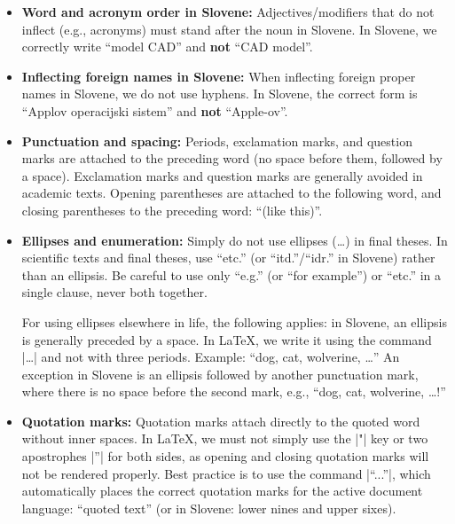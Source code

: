 \documentclass[9pt]{style/friteza}
\begin{document}
\begin{itemize}
    \item \textbf{Word and acronym order in Slovene:} Adjectives/modifiers that do not inflect (e.g., acronyms) must stand after the noun in Slovene. In Slovene, we correctly write \enquote{model CAD} and \textbf{not} \enquote{CAD model}.
    
    \item \textbf{Inflecting foreign names in Slovene:} When inflecting foreign proper names in Slovene, we do not use hyphens. In Slovene, the correct form is \enquote{Applov operacijski sistem} and \textbf{not} \enquote{Apple-ov}.
    
    \item \textbf{Punctuation and spacing:} Periods, exclamation marks, and question marks are attached to the preceding word (no space before them, followed by a space). Exclamation marks and question marks are generally avoided in academic texts. Opening parentheses are attached to the following word, and closing parentheses to the preceding word: \enquote{(like this)}.
    
    \item \textbf{Ellipses and enumeration:} Simply do not use ellipses (\dots) in final theses. In scientific texts and final theses, use \enquote{etc.} (or \enquote{itd.}/\enquote{idr.} in Slovene) rather than an ellipsis. Be careful to use only \enquote{e.g.} (or \enquote{for example}) or \enquote{etc.} in a single clause, never both together.
    
    For using ellipses elsewhere in life, the following applies: in Slovene, an ellipsis is generally preceded by a space. In \LaTeX, we write it using the command \ltx|\dots| and not with three periods. Example: \enquote{dog, cat, wolverine, \dots} An exception in Slovene is an ellipsis followed by another punctuation mark, where there is no space before the second mark, e.g., \enquote{dog, cat, wolverine, \dots!}
    
    \item \textbf{Quotation marks:} Quotation marks attach directly to the quoted word without inner spaces. In \LaTeX{}, we must not simply use the \ltx|"| key or two apostrophes \ltx|''| for both sides, as opening and closing quotation marks will not be rendered properly. Best practice is to use the command \ltx|\enquote{...}|, which automatically places the correct quotation marks for the active document language: \enquote{quoted text} (or in Slovene: lower nines and upper sixes).
    

\end{itemize}
\end{document}
